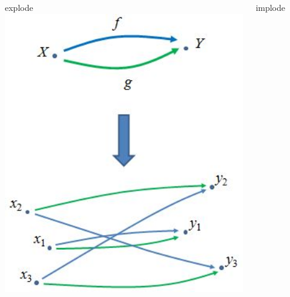 \begin{frame}
\begin{columns}[t]
\begin{column}{0.5\textwidth}
\begin{block}{explode}
\centering\noindent\includegraphics[width=1\textwidth]{fig/explode.jpg}
\end{block}
\end{column}
\begin{column}{0.5\textwidth}
\begin{block}{implode}

\end{block}
\end{column}
\end{columns}
\end{frame}
